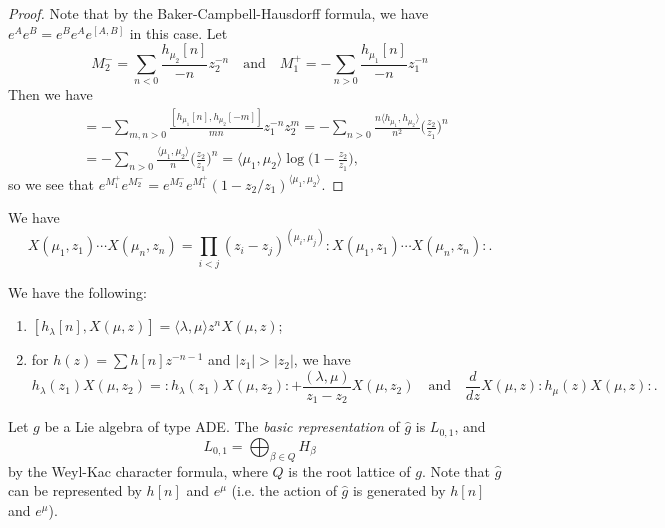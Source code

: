 \begin{proof}
  Note that by the Baker-Campbell-Hausdorff formula, we have
  $e^{A} e^{B} = e^B e^A e^{[A, B]}$
  in this case. Let
  \[
    M_2^-
    = \sum_{n < 0} \frac{h_{\mu_2}[n]}{-n} z_2^{-n}
    \quad \text{and} \quad
    M_1^+
    = -\sum_{n > 0} \frac{h_{\mu_1}[n]}{-n} z_1^{-n}
  \]
  Then we have
  \begin{align*}
    [M_1^+, M_2^-]
    &= -\sum_{m, n > 0} \frac{[h_{\mu_1}[n], h_{\mu_2}[-m]]}{m n} z_1^{-n} z_2^m
    = - \sum_{n > 0} \frac{n \langle h_{\mu_1}, h_{\mu_2} \rangle}{n^2} \bigg(\frac{z_2}{z_1}\bigg)^n \\
    &= - \sum_{n > 0} \frac{\langle \mu_1, \mu_2 \rangle}{n} \bigg(\frac{z_2}{z_1}\bigg)^n
    = \langle \mu_1, \mu_2 \rangle \log\bigg(1 - \frac{z_2}{z_1}\bigg),
  \end{align*}
  so we see that
  $e^{M_1^+} e^{M_2^-} = e^{M_2^-} e^{M_1^+} (1 - z_2 / z_1)^{\langle \mu_1, \mu_2 \rangle}$.
\end{proof}

\begin{corollary}
  We have
  \[
    X(\mu_1, z_1) \cdots X(\mu_n, z_n)
    =
    \prod_{i < j} (z_i - z_j)^{(\mu_i, \mu_j)}
    {:}X(\mu_1, z_1) \cdots X(\mu_n, z_n){:}.
  \]
\end{corollary}

\begin{prop}
  We have the following:
  \begin{enumerate}
    \item $[h_\lambda[n], X(\mu, z)] = \langle \lambda, \mu \rangle z^n X(\mu, z)$;
    \item for $h(z) = \sum h[n] z^{-n - 1}$
      and $|z_1| > |z_2|$,
      we have
      \[
        h_\lambda(z_1) X(\mu, z_2)
        = {:}h_\lambda(z_1) X(\mu, z_2){:}
        + \frac{(\lambda, \mu)}{z_1 - z_2} X(\mu, z_2)
        \quad \text{and} \quad
        \frac{d}{dz} X(\mu, z) {:} h_\mu(z) X(\mu, z) {:}.
      \]
  \end{enumerate}
\end{prop}

\begin{remark}
  Let $g$ be a Lie algebra of
  type ADE. The \emph{basic representation}
  of $\widehat{g}$ is
  $L_{0, 1}$, and
  \[L_{0, 1} = \bigoplus_{\beta \in Q} H_\beta\]
  by the
  Weyl-Kac character formula,
  where $Q$ is the root lattice of $g$.
  Note that $\widehat{g}$ can be
  represented by $h[n]$ and $e^\mu$ (i.e.
  the action of $\widehat{g}$ is generated by
  $h[n]$ and $e^\mu$).
\end{remark}

